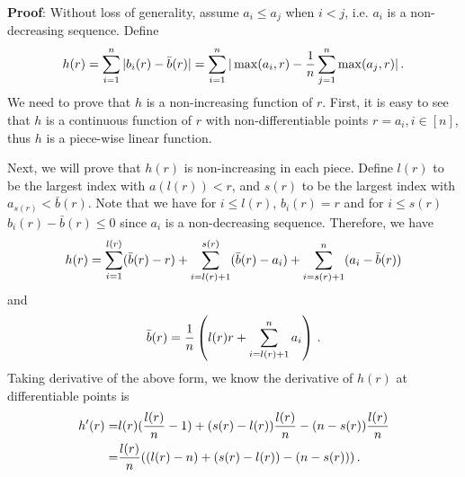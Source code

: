 \documentclass{article} %
\begin{document}
{ \textbf{Proof}:}
Without loss of generality, assume $a_i \leq a_j$ when $i < j$, i.e. $a_i$ is a non-decreasing sequence. Define 
\begin{align}\notag
h(r) = \sum_{i=1}^n |b_i(r) - \bar b(r)| = \sum_{i=1}^n |\max (a_i,r) - \frac{1}{n}\sum_{j=1}^n \max(a_j,r)|\, .
\end{align}
We need to prove that $h$ is a non-increasing function of $r$. 
First,
it is easy to see that $h$ is a continuous function of $r$ with non-differentiable points $r = a_i, i \in [n]$, thus $h$ is a piece-wise linear function.

Next, we will prove that $h(r)$ is  non-increasing in each piece.
Define $ l(r)$ to be the largest index with $a(l(r)) < r$, and $s(r)$ to be the largest index with $a_{s(r)} < \bar b(r)$. Note that we have for $i \leq l(r)$, $b_i(r) = r$ and for $i \leq s(r)$ $b_i(r) - \bar b(r) \leq 0$ since $a_i$ is a non-decreasing sequence. 
Therefore, we have 
\begin{align}\notag
h(r) = \sum_{i=1}^{l(r)} (\bar b(r) - r) + \sum_{i= l(r)+1} ^{s(r) } (\bar b(r) - a_i) + \sum_{i= s(r)+1}^n (a_i - \bar b(r))
\end{align}
and 
\begin{align}\notag
\bar b(r) = \frac{1}{n}\left (l(r) r + \sum_{i=l(r)+1}^n a_i\right) \, .
\end{align}
Taking derivative of the above form, we know the derivative of $h(r)$ at differentiable points is
\begin{align}\notag
\begin{split}
h'(r) = &l(r) (\frac{l(r)}{n}-1) + (s(r)-l(r)) \frac{l(r)}{n} - (n-s(r)) \frac{l(r)}{n}  \\
= & \frac{l(r)}{n} ((l(r) - n) + (s(r) - l(r)) - (n-s(r))) \, .
\end{split}
\end{align}
\end{document}
